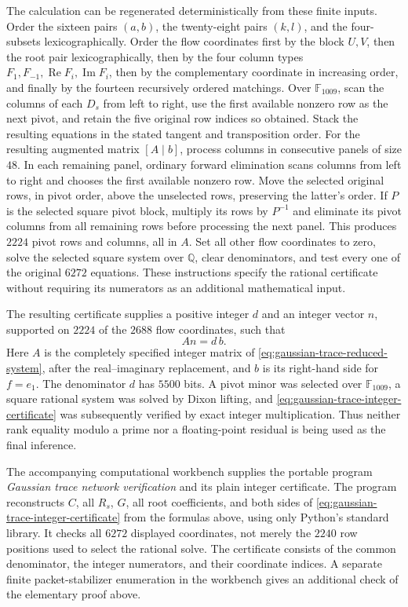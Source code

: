 \documentclass[11pt]{article}
\theoremstyle{definition}
\theoremstyle{remark}
\begin{document}
The calculation can be regenerated deterministically from these
finite inputs.  Order the sixteen pairs \((a,b)\), the twenty-eight
pairs \((k,l)\), and the four-subsets lexicographically.  Order the
flow coordinates first by the block \(U,V\), then the root pair
lexicographically, then by the four column types
\(F_1,F_{-1},\operatorname{Re}F_i,\operatorname{Im}F_i\), then by
the complementary coordinate in increasing order, and finally by
the fourteen recursively ordered matchings.  Over
\(\mathbb F_{1009}\), scan the columns of each \(D_s\) from left
to right, use the first available nonzero row as the next pivot,
and retain the five original row indices so obtained.  Stack the
resulting equations in the stated tangent and transposition order.
For the resulting augmented matrix \([A\mid b]\), process columns
in consecutive panels of size \(48\).  In each remaining panel,
ordinary forward elimination scans columns from left to right and
chooses the first available nonzero row.  Move the selected original
rows, in pivot order, above the unselected rows, preserving the
latter's order.  If \(P\) is the selected square pivot block,
multiply its rows by \(P^{-1}\) and eliminate its pivot columns
from all remaining rows before processing the next panel.
This produces \(2224\) pivot rows and columns, all in \(A\).
Set all other flow coordinates to zero, solve the selected square
system over \(\mathbb Q\), clear denominators, and test every
one of the original \(6272\) equations.  These instructions specify
the rational certificate without requiring its numerators as an
additional mathematical input.

The resulting certificate supplies a positive integer \(d\) and an integer
vector \(n\), supported on \(2224\) of the \(2688\) flow coordinates,
such that
\begin{equation}
 A n=d\,b.
 \label{eq:gaussian-trace-integer-certificate}
\end{equation}
Here \(A\) is the completely specified integer matrix of \eqref{eq:gaussian-trace-reduced-system}, after
the real--imaginary replacement, and \(b\) is its right-hand side for
\(f=e_1\).  The denominator \(d\) has \(5500\) bits.  A pivot minor
was selected over \(\mathbb F_{1009}\), a square rational system was
solved by Dixon lifting, and \eqref{eq:gaussian-trace-integer-certificate} was subsequently verified by exact
integer multiplication.  Thus neither rank equality modulo a prime
nor a floating-point residual is being used as the final inference.

The accompanying computational workbench supplies the portable
program \emph{Gaussian trace network verification} and its plain
integer certificate.  The program reconstructs \(C\),
all \(R_s\), \(G\), all root coefficients, and both sides of \eqref{eq:gaussian-trace-integer-certificate}
from the formulas above, using only Python's standard library.
It checks all \(6272\) displayed coordinates, not merely the
\(2240\) row positions used to select the rational solve.  The
certificate consists of the common denominator, the integer
numerators, and their coordinate indices.  A separate finite
packet-stabilizer enumeration in the workbench gives
an additional check of the elementary proof above.
\end{document}
